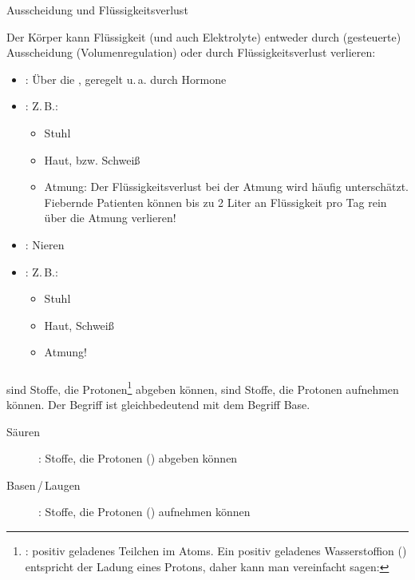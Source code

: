 \TextSlide
{Ausscheidung und Flüssigkeitsverlust}
{%
Der Körper kann Flüssigkeit (und auch Elektrolyte) entweder
durch (gesteuerte) Ausscheidung (Volumenregulation) oder
durch Flüssigkeitsverlust verlieren:

\begin{itemize}
  \item {}: Über die , geregelt
  u.\,a. durch Hormone
  \item {}: Z.\,B.:
  \begin{itemize}
    \item Stuhl
    \item Haut, bzw. Schweiß
    \item Atmung: Der Flüssigkeitsverlust bei der Atmung
    wird häufig unterschätzt. Fiebernde Patienten können bis
    zu 2 Liter an Flüssigkeit pro Tag rein über die Atmung verlieren!
  \end{itemize}
\end{itemize}
}
{%
\begin{itemize}
  \item {}: {Nieren}
  \item {}: Z.\,B.:
  \begin{itemize}
    \item Stuhl
    \item Haut, Schweiß
    \item Atmung!
  \end{itemize}
\end{itemize}
}
{}
{}
{}

\bigskip
\subsubsection{}
\label{topic:saeure-basen-haushalt}
\label{topic:vitalfunktion-saeure-basen-haushalt}


{%
 sind Stoffe, die Protonen\footnote{:
positiv geladenes Teilchen im Atoms. Ein positiv geladenes
Wasserstoffion () entspricht der Ladung eines
Protons, daher kann man vereinfacht sagen:
} abgeben
können,  sind Stoffe, die Protonen aufnehmen
können. Der
Begriff
 ist gleichbedeutend mit dem Begriff Base. \cite{LoefflerBiochemie7}

\bigskip

\bigskip
}{%
\begin{description}
  \item[{Säuren}]: Stoffe, die
  Protonen () abgeben können
  \item[{Basen}\,/\,{Laugen}]: Stoffe, die
  Protonen () aufnehmen können
\end{description}
}{}{}{}



